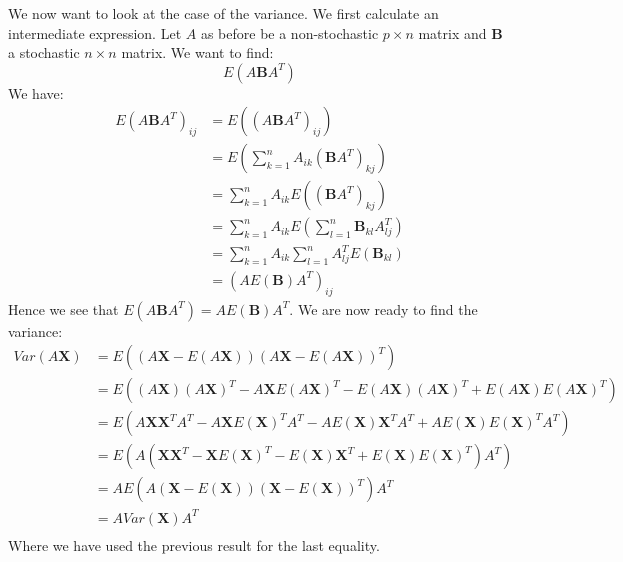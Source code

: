 \documentclass{article}
\begin{document}
We now want to look at the case of the variance. We first calculate an
intermediate expression. Let $A$ as before be a non-stochastic $p \times n$
matrix and $\mathbf{B}$ a stochastic $n \times n$ matrix. We want to find:
$$E(A \mathbf{B} A^T)$$
We have:
\begin{align*}
    E(A \mathbf{B} A^T)_{i j} & = E((A \mathbf{B} A^T)_{i j})                                         \\
                              & = E(\sum_{k = 1}^n A_{i k} (\mathbf{B} A^T)_{k j})                    \\
                              & = \sum_{k = 1}^n A_{i k} E((\mathbf{B} A^T)_{k j})                    \\
                              & = \sum_{k = 1}^n A_{i k} E(\sum_{l=1}^{n} \mathbf{B}_{k l} A^T_{l j}) \\
                              & = \sum_{k = 1}^n A_{i k} \sum_{l=1}^{n} A^T_{l j} E(\mathbf{B}_{k l}) \\
                              & = (A E(\mathbf{B}) A^T)_{i j}
\end{align*}
Hence we see that $E(A \mathbf{B} A^T) = A E(\mathbf{B}) A^T$.  We are now ready
to find the variance:
\begin{align*}
    Var(A \mathbf{X}) & = E((A \mathbf{X} - E(A \mathbf{X})) (A \mathbf{X} - E(A \mathbf{X}))^T)                                                                       \\
                      & = E((A \mathbf{X})(A \mathbf{X})^T  - A \mathbf{X} E(A \mathbf{X})^T - E(A \mathbf{X}) (A \mathbf{X})^T + E(A \mathbf{X}) E(A \mathbf{X})^T)   \\
                      & = E(A \mathbf{X}\mathbf{X}^T A^T  - A \mathbf{X} E(\mathbf{X})^T A^T - A E(\mathbf{X}) \mathbf{X}^T A^T + A E(\mathbf{X}) E(\mathbf{X})^T A^T) \\
                      & = E(A (\mathbf{X}\mathbf{X}^T  - \mathbf{X} E(\mathbf{X})^T - E(\mathbf{X}) \mathbf{X}^T + E(\mathbf{X}) E(\mathbf{X})^T ) A^T)                \\
                      & = A E(A (\mathbf{X} - E(\mathbf{X})) (\mathbf{X} - E(\mathbf{X}))^T) A^T                                                                       \\
                      & = A Var(\mathbf{X}) A^T                                                                                                                        \\
\end{align*}
Where we have used the previous result for the last equality.


\end{document}
